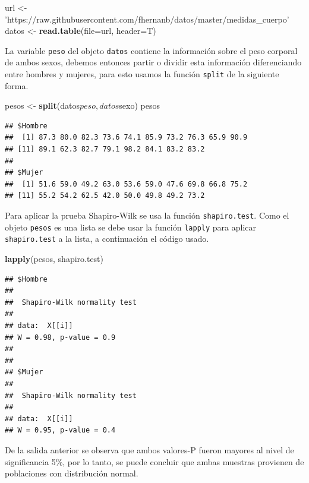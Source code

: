 \documentclass[10pt,]{krantz}
\makeatletter
\newenvironment{Shaded}{\begin{snugshade}}{\end{snugshade}}
\newcommand{\KeywordTok}[1]{\textcolor[rgb]{0.13,0.29,0.53}{\textbf{{#1}}}}
\newcommand{\DataTypeTok}[1]{\textcolor[rgb]{0.13,0.29,0.53}{{#1}}}
\newcommand{\StringTok}[1]{\textcolor[rgb]{0.31,0.60,0.02}{{#1}}}
\newcommand{\NormalTok}[1]{{#1}}
\newenvironment{kframe}{%
\medskip{}
\setlength{\fboxsep}{.8em}
 \def\at@end@of@kframe{}%
 \ifinner\ifhmode%
  \def\at@end@of@kframe{\end{minipage}}%
  \begin{minipage}{\columnwidth}%
 \fi\fi%
 \def\FrameCommand##1{\hskip\@totalleftmargin \hskip-\fboxsep
 \colorbox{shadecolor}{##1}\hskip-\fboxsep
     \hskip-\linewidth \hskip-\@totalleftmargin \hskip\columnwidth}%
 \MakeFramed {\advance\hsize-\width
   \@totalleftmargin\z@ \linewidth\hsize
   \@setminipage}}%
 {\par\unskip\endMakeFramed%
 \at@end@of@kframe}
\renewenvironment{Shaded}{\begin{kframe}}{\end{kframe}}
\makeatother
\begin{document}
\begin{Shaded}
\begin{Highlighting}[]
\NormalTok{url <-}\StringTok{ 'https://raw.githubusercontent.com/fhernanb/datos/master/medidas_cuerpo'}
\NormalTok{datos <-}\StringTok{ }\KeywordTok{read.table}\NormalTok{(}\DataTypeTok{file=}\NormalTok{url, }\DataTypeTok{header=}\NormalTok{T)}
\end{Highlighting}
\end{Shaded}

La variable \texttt{peso} del objeto \texttt{datos} contiene la
información sobre el peso corporal de ambos sexos, debemos entonces
partir o dividir esta información diferenciando entre hombres y mujeres,
para esto usamos la función \texttt{split} de la siguiente forma.

\begin{Shaded}
\begin{Highlighting}[]
\NormalTok{pesos <-}\StringTok{ }\KeywordTok{split}\NormalTok{(datos$peso, datos$sexo)}
\NormalTok{pesos}
\end{Highlighting}
\end{Shaded}

\begin{verbatim}
## $Hombre
##  [1] 87.3 80.0 82.3 73.6 74.1 85.9 73.2 76.3 65.9 90.9
## [11] 89.1 62.3 82.7 79.1 98.2 84.1 83.2 83.2
## 
## $Mujer
##  [1] 51.6 59.0 49.2 63.0 53.6 59.0 47.6 69.8 66.8 75.2
## [11] 55.2 54.2 62.5 42.0 50.0 49.8 49.2 73.2
\end{verbatim}

Para aplicar la prueba Shapiro-Wilk se usa la función
\texttt{shapiro.test}. Como el objeto \texttt{pesos} es una lista se
debe usar la función \texttt{lapply} para aplicar \texttt{shapiro.test}
a la lista, a continuación el código usado.

\begin{Shaded}
\begin{Highlighting}[]
\KeywordTok{lapply}\NormalTok{(pesos, shapiro.test)}
\end{Highlighting}
\end{Shaded}

\begin{verbatim}
## $Hombre
## 
##  Shapiro-Wilk normality test
## 
## data:  X[[i]]
## W = 0.98, p-value = 0.9
## 
## 
## $Mujer
## 
##  Shapiro-Wilk normality test
## 
## data:  X[[i]]
## W = 0.95, p-value = 0.4
\end{verbatim}

De la salida anterior se observa que ambos valores-P fueron mayores al
nivel de significancia 5\%, por lo tanto, se puede concluir que ambas
muestras provienen de poblaciones con distribución normal.
\end{document}
